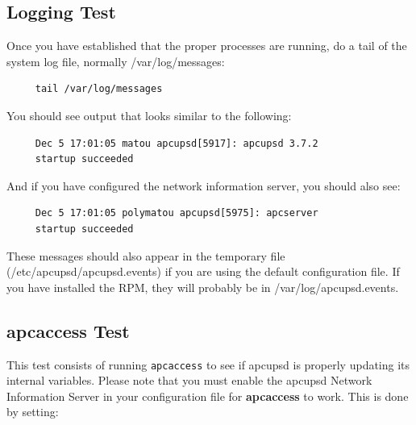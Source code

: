 \label{Logging-Test}

\subsection*{Logging Test}

\label{index-Testing_002c-Logging-87}
\label{index-Logging_002c-Testing-88}
Once you have established that the proper processes are running, do a tail of
the system log file, normally /var/log/messages: 

\footnotesize
\begin{verbatim}
     tail /var/log/messages
\end{verbatim}
\normalsize

You should see output that looks similar to the following: 

\footnotesize
\begin{verbatim}
     Dec 5 17:01:05 matou apcupsd[5917]: apcupsd 3.7.2
     startup succeeded
\end{verbatim}
\normalsize

And if you have configured the network information server, you should also
see: 

\footnotesize
\begin{verbatim}
     Dec 5 17:01:05 polymatou apcupsd[5975]: apcserver
     startup succeeded
\end{verbatim}
\normalsize

These messages should also appear in the temporary file
(/etc/apcupsd/apcupsd.events) if you are using the default configuration file.
If you have installed the RPM, they will probably be in
/var/log/apcupsd.events. 

\label{apcaccess-Test}

\subsection*{apcaccess Test}

\label{index-Testing_002c-apcaccess-89}
\label{index-apcaccess-Test-90}
This test consists of running {\tt apcaccess} to see if apcupsd is properly
updating its internal variables.  Please note that you must enable the 
apcupsd Network Information Server in your configuration file for 
{\bf apcaccess} to work.  This is done by setting: 

